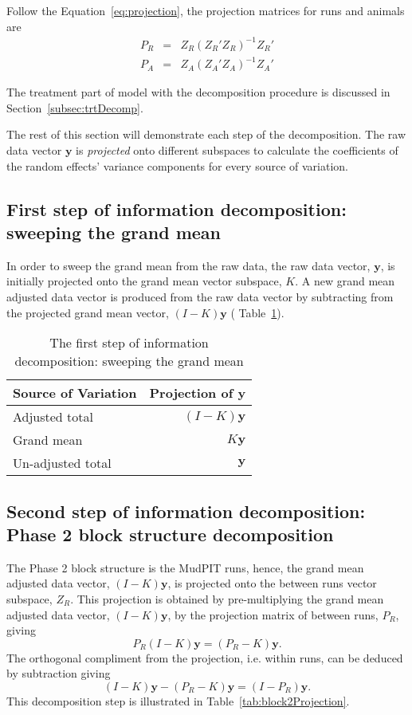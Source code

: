 \documentclass[article]{jss}
\begin{document}
Follow the Equation~\ref{eq:projection}, the projection matrices for runs and animals are
\begin{eqnarray*}
P_{R} &=&  Z_{R}(Z_{R}'Z_{R})^{-1}Z_{R}'\\
P_{A} &=&  Z_{A}(Z_{A}'Z_{A})^{-1}Z_{A}'
\end{eqnarray*}

The treatment part of model with the decomposition procedure is discussed in Section~\ref{subsec:trtDecomp}.

The rest of this section will demonstrate each step of the decomposition. The raw data vector $\bm{y}$ is \emph{projected} onto different subspaces to calculate the coefficients of the random effects' variance components for every source of variation.

\subsection{First step of information decomposition: sweeping the grand mean}
In order to sweep the grand mean from the raw data, the raw data vector, $\bm{y}$, is initially projected onto the grand mean vector subspace, $K$. A new grand mean adjusted data vector is produced from the raw data vector by subtracting from the projected grand mean vector, $(I-K)\bm{y}$ ( Table~\ref{tab:totalProjection}).

\begin{table}[ht]
\centering
\caption{The first step of information decomposition: sweeping the grand mean} 
\begin{tabular}[t]{lr}
\hline
\multicolumn{1}{l}{Source of Variation}  & \multicolumn{1}{l}{Projection of $\bm{y}$}\\
\hline
Adjusted total  								&$(I-K)\bm{y}$  \\
Grand mean  								& $K\bm{y}$  \\
\hline
Un-adjusted total  								&$\bm{y}$  \\
\hline
\end{tabular}
\label{tab:totalProjection}
\end{table}


\subsection{Second step of information decomposition: Phase 2 block structure decomposition}
The Phase 2 block structure is the MudPIT runs, hence, the grand mean adjusted data vector, $(I-K)\bm{y}$, is projected onto the between runs vector subspace, $Z_R$. This projection is obtained by pre-multiplying the grand mean adjusted data vector, $(I-K)\bm{y}$, by the projection matrix of between runs, $P_{R}$, giving \[P_{R}(I-K)\bm{y} = (P_{R}-K)\bm{y}.\]
The orthogonal compliment from the projection, i.e. within runs, can be deduced by subtraction giving
\[
(I-K)\bm{y} - (P_{R}-K)\bm{y} = (I-P_R)\bm{y}.
\]
This decomposition step is illustrated in Table~\ref{tab:block2Projection}.
\end{document}
